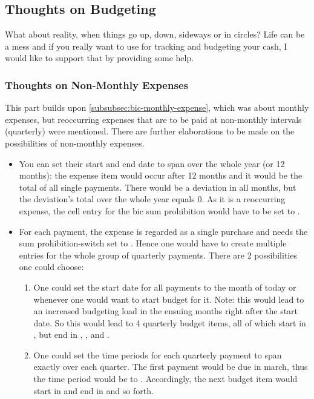 \subsection{Thoughts on Budgeting}
\label{subsec:thoughts-on-budgeting}

What about reality, when things go up, down, sideways or in circles?
Life can be a mess and if you really want to use \tfn for tracking and budgeting your cash, I would like to support that by providing some help.

\subsubsection{Thoughts on Non-Monthly Expenses}
\label{subsubsec:thoughts-non-monthly-expenses}

This part builds upon \autoref{subsubsec:bic-monthly-expense}, which was about monthly expenses, but reoccurring expenses that are to be paid at non-monthly intervals (\eg quarterly) were mentioned.
There are further elaborations to be made on the possibilities of non-monthly expenses.
\begin{itemize}
	\item You can set their start and end date to span over the whole year (or 12 months): the expense item would occur after 12 months and it would be the total of all single payments.
	There would be a deviation in all months, but the deviation's total over the whole year equals 0.
	As it is a reoccurring expense, the cell entry for the \ac{bic} sum prohibition would have to be set to .
	\item For each payment, \ie the expense is regarded as a single purchase and needs the sum prohibition-switch set to .
	Hence one would have to create multiple entries for the whole group of quarterly payments.
	There are 2 possibilities one could choose:
	\begin{enumerate}
		\item One could set the start date for all payments to the month of today or whenever one would want to start budget for it.
		Note: this would lead to an increased budgeting load in the ensuing months right after the start date.
		So this would lead to 4 quarterly budget items, all of which start in , but end in , ,  and .
		\item One could set the time periods for each quarterly payment to span exactly over each quarter.
		The first payment would be due in march, thus the time period would be  to .
		Accordingly, the next budget item would start in  and end in  and so forth.
	\end{enumerate}
\end{itemize}

